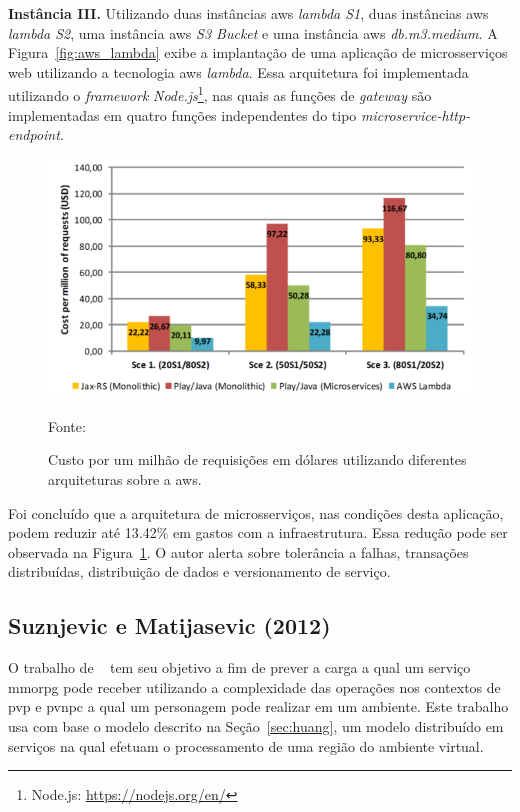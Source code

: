 \textbf{Instância III.} Utilizando duas instâncias \ac{aws} \textit{lambda S1}, duas instâncias \ac{aws} \textit{lambda S2}, uma instância \ac{aws} \textit{S3 Bucket} e uma instância \ac{aws} \textit{db.m3.medium}.
%
A Figura~\ref{fig:aws_lambda} exibe a implantação de uma aplicação de microsserviços web utilizando a tecnologia \ac{aws} \textit{lambda}. Essa arquitetura foi implementada utilizando o \textit{framework} \textit{Node.js}\footnote{Node.js: \url{https://nodejs.org/en/}}, nas quais as funções de \textit{gateway} são implementadas em quatro funções independentes do tipo \textit{microservice-http-endpoint}.



\begin{figure}[htb!]
\caption{Custo por um milhão de requisições em dólares utilizando diferentes arquiteturas sobre a \ac{aws}.}
\label{fig:custo_aws}
\includegraphics[width=\textwidth]{img/cap2/custo_aws.png}
\centering

Fonte:~\cite{7515686}
\end{figure}



Foi concluído que a arquitetura de microsserviços, nas condições desta aplicação, podem reduzir até 13.42\% em gastos com a infraestrutura.
%
Essa redução pode ser observada na Figura~\ref{fig:custo_aws}.
%
O autor alerta sobre tolerância a falhas, transações distribuídas, distribuição de dados e versionamento de serviço.


\subsection{Suznjevic e Matijasevic (2012)}



O trabalho de ~\cite{6374456} tem seu objetivo a fim de prever a carga a qual um serviço \ac{mmorpg} pode receber utilizando a complexidade das operações nos contextos de \ac{pvp} e \ac{pvnpc} a qual um personagem pode realizar em um ambiente.
%
Este trabalho usa com base o modelo descrito na Seção~\ref{sec:huang}, um modelo distribuído em serviços na qual efetuam o processamento de uma região do ambiente virtual.



